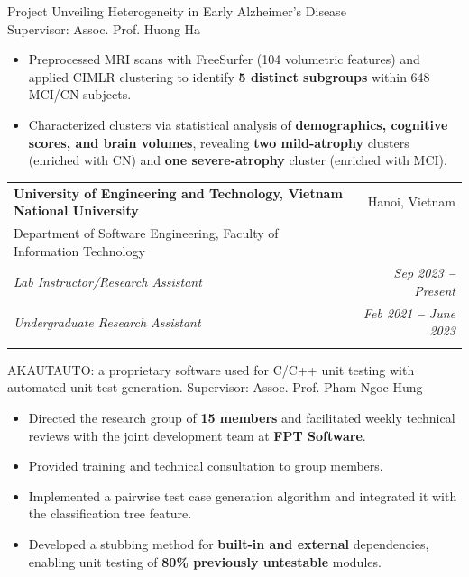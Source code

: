 \documentclass[letterpaper,11pt]{article}
\makeatletter
\newcommand{\resumeItem}[1]{
  \item\small{
    {#1 \vspace{-2pt}}
  }
}
\newcommand{\resumeSubheadingQuad}[9]{
  \vspace{-2pt}\item
    \begin{tabular*}{0.97\textwidth}[t]{l@{\extracolsep{\fill}}r}
      \textbf{#1} & #2 \\
      \small #3 & \\
      \textit{\small#4} & \textit{\small #5} \\
      \textit{\small#6} & \textit{\small #7} \\
      \textit{\small#8} & \textit{\small #9} \\
    \end{tabular*}\vspace{-7pt}
}
\newcommand{\resumeItemListStart}{\begin{itemize}}
\newcommand{\resumeItemListEnd}{\end{itemize}\vspace{-5pt}}
\makeatother
\begin{document}
\vspace{-0.75em}

\small
Project Unveiling Heterogeneity in Early Alzheimer's Disease
\\Supervisor: Assoc. Prof. Huong Ha
\vspace{-0.75em}
\begin{itemize}
  \item Preprocessed MRI scans with FreeSurfer (104 volumetric features) and applied CIMLR clustering to identify \textbf{5 distinct subgroups} within 648 MCI/CN subjects.
  \item Characterized clusters via statistical analysis of \textbf{demographics, cognitive scores, and brain volumes}, revealing \textbf{two mild-atrophy} clusters (enriched with CN) and \textbf{one severe-atrophy} cluster (enriched with MCI).
\end{itemize}
\normalsize

\vspace{-0.75em}

\resumeSubheadingQuad
{University of Engineering and Technology, Vietnam National University}{Hanoi, Vietnam}
{Department of Software Engineering, Faculty of Information Technology}
{Lab Instructor/Research Assistant}{Sep 2023 \textbf{--} Present}
{Undergraduate Research Assistant}{Feb 2021 \textbf{--} June 2023}
{}{}
\vspace{-1.25em}

\small
AKAUTAUTO: a proprietary software used for C/C++ unit testing with automated unit test generation. Supervisor: Assoc. Prof. Pham Ngoc Hung
\vspace{-0.75em}
\begin{itemize}
  \item Directed the research group of \textbf{15 members} and facilitated weekly technical reviews with the joint development team at \textbf{FPT Software}.
  \item Provided training and technical consultation to group members.
  \item Implemented a pairwise test case generation algorithm and integrated it with the classification tree feature.
  \item Developed a stubbing method for \textbf{built-in and external}
        dependencies, enabling unit testing of \textbf{80\% previously untestable} modules.
\end{itemize}
\normalsize
\end{document}

